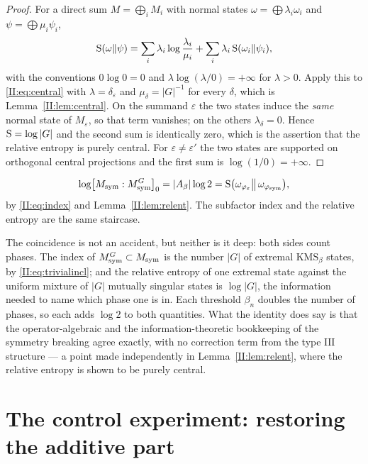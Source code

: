 \begin{proof}
For a direct sum $M=\bigoplus_iM_i$ with normal states $\omega=\bigoplus\lambda_i\omega_i$
and $\psi=\bigoplus\mu_i\psi_i$,
\[
\mathrm{S}(\omega\|\psi)=\sum_i\lambda_i\log\frac{\lambda_i}{\mu_i}+\sum_i\lambda_i\,\mathrm{S}(\omega_i\|\psi_i),
\]
with the conventions $0\log0=0$ and $\lambda\log(\lambda/0)=+\infty$ for $\lambda>0$. Apply
this to \eqref{II:eq:central} with $\lambda=\delta_\varepsilon$ and $\mu_\delta=|G|^{-1}$ for
every $\delta$, which is Lemma~\ref{II:lem:central}. On the summand $\varepsilon$ the two
states induce the \emph{same} normal state of $M_\varepsilon$, so that term vanishes; on the
others $\lambda_\delta=0$. Hence $\mathrm{S}=\log|G|$ and the second sum is identically zero,
which is the assertion that the relative entropy is purely central. For
$\varepsilon\ne\varepsilon'$ the two states are supported on orthogonal central projections
and the first sum is $\log(1/0)=+\infty$.
\end{proof}

\begin{corollary}\label{II:cor:staircase}
\[
\log\bigl[M_{\mathrm{sym}}:M_{\mathrm{sym}}^G\bigr]_0=|A_\beta|\log2=\mathrm{S}\bigl(\omega_{\varphi_\varepsilon}\big\|\,\omega_{\varphi_{\mathrm{sym}}}\bigr),
\]
by \eqref{II:eq:index} and Lemma~\ref{II:lem:relent}. The subfactor index and the relative
entropy are the same staircase.

The coincidence is not an accident, but neither is it deep: both sides count phases. The
index of $M_{\mathrm{sym}}^G\subset M_{\mathrm{sym}}$ is the number $|G|$ of extremal $\mathrm{KMS}_\beta$ states,
by \eqref{II:eq:trivialincl}; and the relative entropy of one extremal state against the
uniform mixture of $|G|$ mutually singular states is $\log|G|$, the information needed to
name which phase one is in. Each threshold $\beta_n$ doubles the number of phases, so each
adds $\log2$ to both quantities. What the identity does say is that the operator-algebraic
and the information-theoretic bookkeeping of the symmetry breaking agree exactly, with no
correction term from the type $\mathrm{III}$ structure --- a point made independently in
Lemma~\ref{II:lem:relent}, where the relative entropy is shown to be purely central.
\end{corollary}

\section{The control experiment: restoring the additive part}\label{II:sec:affine}

